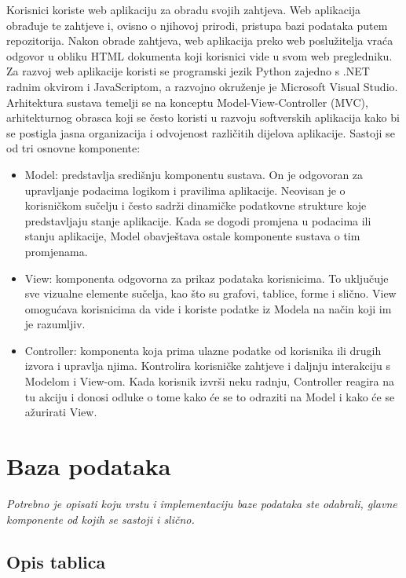 		Korisnici koriste web aplikaciju za obradu svojih zahtjeva. Web aplikacija obrađuje te zahtjeve i, ovisno o njihovoj prirodi, pristupa bazi podataka putem repozitorija. Nakon obrade zahtjeva, web aplikacija preko web poslužitelja vraća odgovor u obliku HTML dokumenta koji korisnici vide u svom web pregledniku. Za razvoj web aplikacije koristi se programski jezik Python zajedno s .NET radnim okvirom i JavaScriptom, a razvojno okruženje je Microsoft Visual Studio. Arhitektura sustava temelji se na konceptu Model-View-Controller (MVC), arhitekturnog obrasca koji se često koristi u razvoju softverskih aplikacija kako bi se postigla jasna organizacija i odvojenost različitih dijelova aplikacije. Sastoji se od tri osnovne komponente:
	\begin{itemize}
		\item 	{Model: predstavlja središnju komponentu sustava. On je odgovoran za upravljanje podacima logikom i pravilima aplikacije. Neovisan je o korisničkom sučelju i često sadrži dinamičke podatkovne strukture koje predstavljaju stanje aplikacije. Kada se dogodi promjena u podacima ili stanju aplikacije, Model obavještava ostale komponente sustava o tim promjenama.}
		\item 	{View: komponenta odgovorna za prikaz podataka korisnicima. To uključuje sve vizualne elemente sučelja, kao što su grafovi, tablice, forme i slično. View omogućava korisnicima da vide i koriste podatke iz Modela na način koji im je razumljiv.}
		\item 	{Controller: komponenta koja prima ulazne podatke od korisnika ili drugih izvora i upravlja njima. Kontrolira korisničke zahtjeve i daljnju interakciju s Modelom i View-om. Kada korisnik izvrši neku radnju, Controller reagira na tu akciju i donosi odluke o tome kako će se to odraziti na Model i kako će se ažurirati View.}
	\end{itemize}

	
		

		

				
		\section{Baza podataka}
					
		\textit{Potrebno je opisati koju vrstu i implementaciju baze podataka ste odabrali, glavne komponente od kojih se sastoji i slično.}
		
			\subsection{Opis tablica}
			

